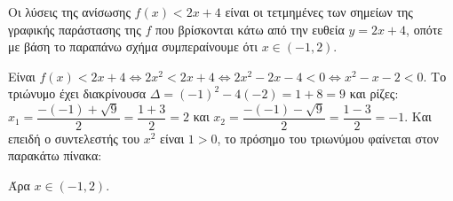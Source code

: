 \begin{alist}
\item 
\begin{rlist}
\item Οι λύσεις της ανίσωσης $f(x) < 2x + 4$ είναι οι τετμημένες των σημείων της γραφικής παράστασης της $f$ που βρίσκονται κάτω από την ευθεία $y = 2x + 4$, οπότε με βάση το παραπάνω σχήμα συμπεραίνουμε ότι $x \in (-1, 2)$.
\item Είναι $f(x) < 2x + 4 \Leftrightarrow 2x^2 < 2x + 4 \Leftrightarrow 2x^2 - 2x - 4 < 0 \Leftrightarrow x^2 - x - 2 < 0$.
Το τριώνυμο έχει διακρίνουσα $\Delta = (-1)^2 - 4(-2) = 1 + 8 = 9$ και ρίζες:
$x_1 = \dfrac{-(-1) + \sqrt{9}}{2} = \dfrac{1+3}{2} = 2$ και $x_2 = \dfrac{-(-1) - \sqrt{9}}{2} = \dfrac{1-3}{2} = -1$.
Και επειδή ο συντελεστής του $x^2$ είναι $1 > 0$, το πρόσημο του τριωνύμου φαίνεται στον παρακάτω πίνακα:
\begin{center}
\end{center}
Άρα $x \in (-1, 2)$.
\end{rlist}
\end{alist}

